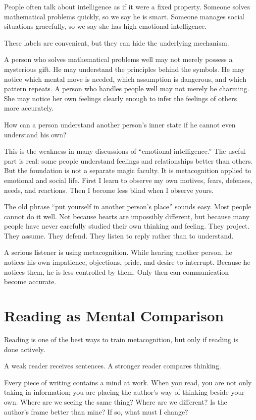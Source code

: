 People often talk about intelligence as if it were a fixed property. Someone solves mathematical problems quickly, so we say he is smart. Someone manages social situations gracefully, so we say she has high emotional intelligence.

These labels are convenient, but they can hide the underlying mechanism.

A person who solves mathematical problems well may not merely possess a mysterious gift. He may understand the principles behind the symbols. He may notice which mental move is needed, which assumption is dangerous, and which pattern repeats. A person who handles people well may not merely be charming. She may notice her own feelings clearly enough to infer the feelings of others more accurately.

How can a person understand another person's inner state if he cannot even understand his own?

This is the weakness in many discussions of ``emotional intelligence.'' The useful part is real: some people understand feelings and relationships better than others. But the foundation is not a separate magic faculty. It is metacognition applied to emotional and social life. First I learn to observe my own motives, fears, defenses, needs, and reactions. Then I become less blind when I observe yours.

The old phrase ``put yourself in another person's place'' sounds easy. Most people cannot do it well. Not because hearts are impossibly different, but because many people have never carefully studied their own thinking and feeling. They project. They assume. They defend. They listen to reply rather than to understand.

A serious listener is using metacognition. While hearing another person, he notices his own impatience, objections, pride, and desire to interrupt. Because he notices them, he is less controlled by them. Only then can communication become accurate.

\section*{Reading as Mental Comparison}

Reading is one of the best ways to train metacognition, but only if reading is done actively.

A weak reader receives sentences. A stronger reader compares thinking.

Every piece of writing contains a mind at work. When you read, you are not only taking in information; you are placing the author's way of thinking beside your own. Where are we seeing the same thing? Where are we different? Is the author's frame better than mine? If so, what must I change?

